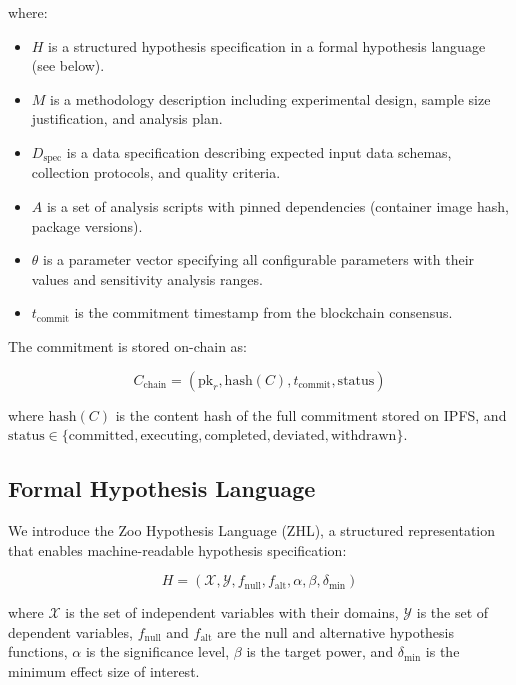\documentclass[11pt,a4paper]{article}
\begin{document}
\noindent where:
\begin{itemize}[leftmargin=*]
    \item $H$ is a structured hypothesis specification in a formal hypothesis language (see below).
    \item $M$ is a methodology description including experimental design, sample size justification, and analysis plan.
    \item $D_{\text{spec}}$ is a data specification describing expected input data schemas, collection protocols, and quality criteria.
    \item $A$ is a set of analysis scripts with pinned dependencies (container image hash, package versions).
    \item $\theta$ is a parameter vector specifying all configurable parameters with their values and sensitivity analysis ranges.
    \item $t_{\text{commit}}$ is the commitment timestamp from the blockchain consensus.
\end{itemize}

The commitment is stored on-chain as:

\begin{equation}
    C_{\text{chain}} = (\text{pk}_r, \text{hash}(C), t_{\text{commit}}, \text{status})
\end{equation}

\noindent where $\text{hash}(C)$ is the content hash of the full commitment stored on IPFS, and $\text{status} \in \{\text{committed}, \text{executing}, \text{completed}, \text{deviated}, \text{withdrawn}\}$.

\subsection{Formal Hypothesis Language}

We introduce the Zoo Hypothesis Language (ZHL), a structured representation that enables machine-readable hypothesis specification:

\begin{equation}
    H = (\mathcal{X}, \mathcal{Y}, f_{\text{null}}, f_{\text{alt}}, \alpha, \beta, \delta_{\min})
\end{equation}

\noindent where $\mathcal{X}$ is the set of independent variables with their domains, $\mathcal{Y}$ is the set of dependent variables, $f_{\text{null}}$ and $f_{\text{alt}}$ are the null and alternative hypothesis functions, $\alpha$ is the significance level, $\beta$ is the target power, and $\delta_{\min}$ is the minimum effect size of interest.
\end{document}
